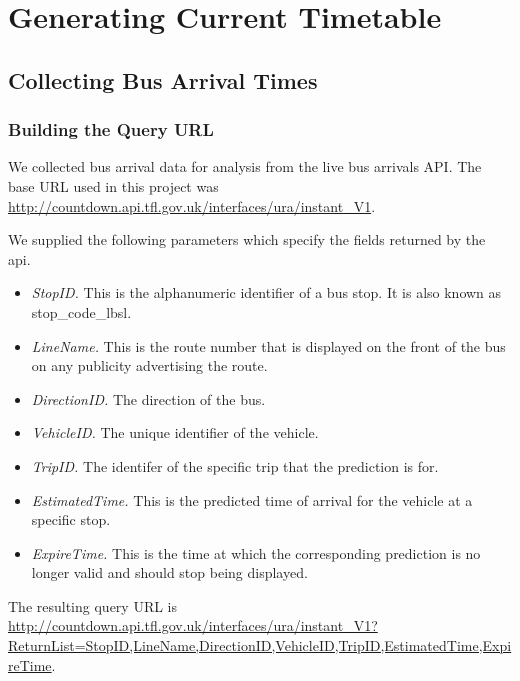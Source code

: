 \section{Generating Current Timetable}
\label{sec:current_timetable_generation}

\subsection{Collecting Bus Arrival Times}
\label{sec:collecting_arrival_times}

\subsubsection{Building the Query URL}
\par We collected bus arrival data for analysis from the live bus arrivals API. The base URL used in this project was \url{http://countdown.api.tfl.gov.uk/interfaces/ura/instant_V1}.

\par We supplied the following parameters which specify the fields returned by the \acrshort{api}.

\begin{itemize}
  \item \textit{StopID.} This is the alphanumeric identifier of a bus stop. It is also known as stop\_code\_lbsl.
  \item \textit{LineName.} This is the route number that is displayed on the front of the bus on any publicity advertising the route.
  \item \textit{DirectionID.} The direction of the bus.
  \item \textit{VehicleID.} The unique identifier of the vehicle.
  \item \textit{TripID.} The identifer of the specific trip that the prediction is for.
  \item \textit{EstimatedTime.} This is the predicted time of arrival for the vehicle at a specific stop.
  \item \textit{ExpireTime.} This is the time at which the corresponding prediction is no longer valid and should stop being displayed.
\end{itemize}

\par The resulting query URL is \sloppy \url{http://countdown.api.tfl.gov.uk/interfaces/ura/instant_V1?ReturnList=StopID,LineName,DirectionID,VehicleID,TripID,EstimatedTime,ExpireTime}.

